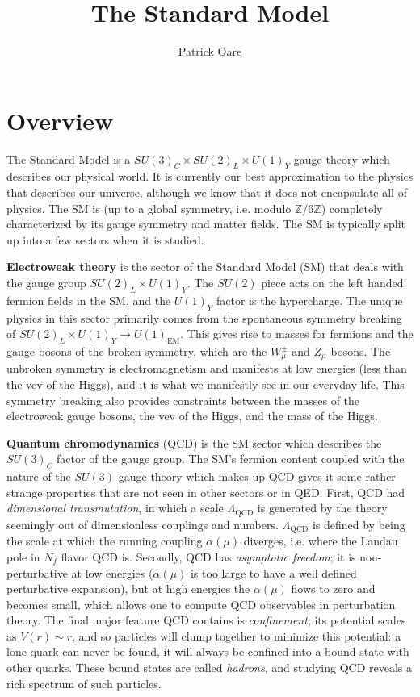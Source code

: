 \documentclass[11pt, oneside]{article}   	%
\title{The Standard Model}
\author{Patrick Oare}
\date{}							%
\theoremstyle{definition}
\numberwithin{equation}{subsection}		%
\begin{document}
\maketitle

\section{Overview}

The Standard Model is a $SU(3)_C\times SU(2)_L\times U(1)_Y$ gauge theory which describes our physical world. It is currently 
our best approximation to the physics that describes our universe, although we know that it does not encapsulate all of physics. 
The SM is (up to a global symmetry, i.e. modulo $\mathbb Z / 6\mathbb Z$) completely characterized by its gauge symmetry 
and matter fields. The SM is typically split up into a few sectors when it is studied.

\textbf{Electroweak theory} is the sector of the Standard Model (SM) that deals with the gauge group $SU(2)_L\times U(1)_Y$. The 
$SU(2)$ piece acts on the left handed fermion fields in the SM, and the $U(1)_Y$ factor is the hypercharge. The unique 
physics in this sector primarily comes from the spontaneous symmetry breaking of $SU(2)_L\times U(1)_Y
\rightarrow U(1)_\mathrm{EM}$. This gives rise to masses for fermions and the gauge bosons of the broken symmetry, 
which are the $W_\mu^\pm$ and $Z_\mu$ bosons. The unbroken symmetry is electromagnetism and manifests at low 
energies (less than the vev of the Higgs), and it is what we 
manifestly see in our everyday life. This symmetry breaking also provides constraints between the masses of the electroweak 
gauge bosons, the vev of the Higgs, and the mass of the Higgs. 

\textbf{Quantum chromodynamics} (QCD) is the SM sector which describes the $SU(3)_C$ factor of the gauge group. 
The SM's fermion content coupled with the nature of the $SU(3)$ gauge theory which makes up QCD gives it some 
rather strange properties that are not seen in other sectors or in QED. First, QCD had \textit{dimensional transmutation}, 
in which a scale $\Lambda_\mathrm{QCD}$ is generated by the theory seemingly out of dimensionless couplings and numbers. 
$\Lambda_\mathrm{QCD}$ is defined by being the scale at which the running coupling $\alpha(\mu)$ diverges, i.e. where the Landau 
pole in $N_f$ flavor QCD is. Secondly, QCD has \textit{asymptotic freedom}; it is non-perturbative at low energies ($\alpha(\mu)$ is 
too large to have a well defined perturbative expansion), but at high energies the $\alpha(\mu)$ flows to zero and becomes small, which 
allows one to compute QCD observables in perturbation theory. The final major feature QCD contains is \textit{confinement}; 
its potential scales as $V(r)\sim r$, and so particles will clump together to minimize this potential: a lone quark can never be found, 
it will always be confined into a bound state with other quarks. These bound states are called \textit{hadrons}, and studying QCD 
reveals a rich spectrum of such particles.
\end{document}
